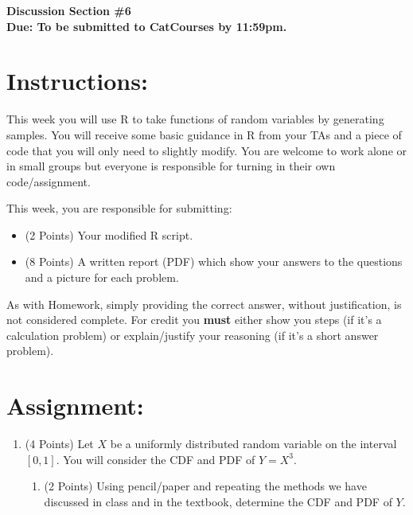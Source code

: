 \documentclass[10pt,letterpaper]{exam}
\begin{document}
\begin{Large}
\begin{center}
\textbf{Discussion Section \#6}\\
\textbf{Due: To be submitted to CatCourses by 11:59pm.}
\end{center}
\end{Large}

\begin{large}
\section*{Instructions:}
\vspace{-.5cm}
This week you will use R to take functions of random variables by generating samples. 
You will receive some basic guidance in R from your TAs and a piece of code that you will only need to slightly modify. You are welcome to work alone or in small groups but everyone is responsible for turning in their own code/assignment. 

This week, you are responsible for submitting:
\begin{itemize}
\item (2 Points) Your modified R script.
\item (8 Points) A written report (PDF) which show your answers to the questions and a picture  for each problem. 
\end{itemize}

As with Homework, simply providing the correct answer, without justification, is not considered complete. For credit you \textbf{must} either show you steps (if it's a calculation problem) or explain/justify your reasoning (if it's a short answer problem).

\section*{Assignment:}
\vspace{-.5cm}

\begin{enumerate}

\item  (4 Points) Let $X$ be a uniformly distributed random variable on the interval $[0,1]$. You will consider the CDF and PDF of $Y = X^{3}$.

\begin{enumerate}
\item (2 Points) Using pencil/paper and repeating the methods we have discussed in class and in the textbook, determine the CDF and PDF of $Y$.


\end{enumerate}
\end{enumerate}
\end{large}
\end{document}
